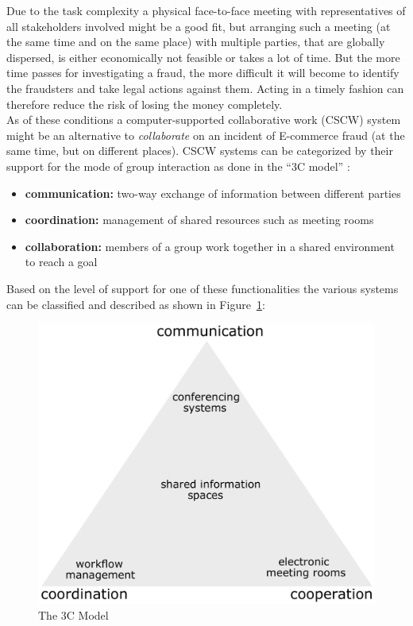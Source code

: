 Due to the task complexity a physical face-to-face meeting with representatives of all stakeholders involved might be a good fit, but arranging such a meeting (at the same time and on the same place) with multiple parties, that are globally dispersed, is either economically not feasible or takes a lot of time. But the more time passes for investigating a fraud, the more difficult it will become to identify the fraudsters and take legal actions against them. Acting in a timely fashion can therefore reduce the risk of losing the money completely. \\

As of these conditions a computer-supported collaborative work (\gls{CSCW}) system might be an alternative to \emph{collaborate} on an incident of \gls{E-commerce} fraud (at the same time, but on different places). \gls{CSCW} systems can be categorized by their support for the mode of group interaction as done in the ``3C model'' \citep{Koch2008}: \@

\begin{itemize}
    \item\textbf{communication:} two-way exchange of information between different parties
    \item\textbf{coordination:} management of shared resources such as meeting rooms
    \item\textbf{collaboration:} members of a group work together in a shared environment to reach a goal
\end{itemize}

Based on the level of support for one of these functionalities the various systems can be classified and described as shown in Figure~\ref{fig:images_3C_model}: \@

\begin{figure}[H]
	\centering
		\includegraphics[width=0.7\columnwidth]{images/3C-model.pdf}
	\caption[The 3C Model]{The 3C Model \citep{Koch2008}}
\label{fig:images_3C_model}
\end{figure}

